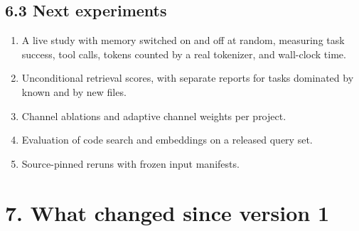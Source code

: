 \documentclass[
  american,
  11pt,
]{article}
\providecommand{\tightlist}{%
  \setlength{\itemsep}{0pt}\setlength{\parskip}{0pt}}
\begin{document}
\subsection{6.3 Next experiments}\label{next-experiments}

\begin{enumerate}
\def\labelenumi{\arabic{enumi}.}
\tightlist
\item
  A live study with memory switched on and off at random, measuring task success, tool calls, tokens counted
  by a real tokenizer, and wall-clock time.
\item
  Unconditional retrieval scores, with separate reports for tasks dominated by known and by new files.
\item
  Channel ablations and adaptive channel weights per project.
\item
  Evaluation of code search and embeddings on a released query set.
\item
  Source-pinned reruns with frozen input manifests.
\end{enumerate}

\section{7. What changed since version 1}\label{what-changed-since-version-1}
\end{document}
